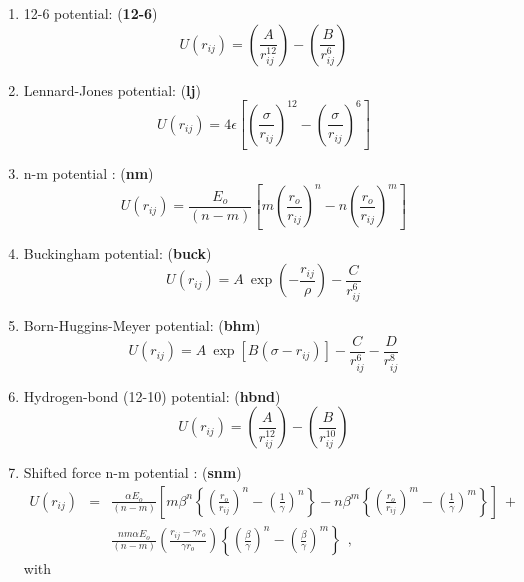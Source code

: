 \begin{enumerate}
\item 12-6 potential:  ({\bf 12-6})
\begin{equation}
U(r_{ij}) =
\left(\frac{A}{r_{ij}^{12}}\right)-\left(\frac{B}{r_{ij}^{6}}\right)
\end{equation}
\item Lennard-Jones potential:  ({\bf lj})
\begin{equation}
U(r_{ij}) = 4\epsilon\left[\left
(\frac{\sigma}{r_{ij}}\right)^{12}-\left(\frac{\sigma}{r_{ij}}\right)^{6}\right]
\end{equation}
\item n-m potential \cite{mie-03a,clarke-86a}:  ({\bf nm})
\begin{equation}
U(r_{ij}) = \frac{E_{o}}{(n-m)}\left[m\left
(\frac{r_{o}}{r_{ij}}\right)^{n}-n\left(\frac{r_{o}}{r_{ij}}\right)^{m}\right]
\end{equation}
\item Buckingham potential:  ({\bf buck})
\begin{equation}
U(r_{ij}) =
A~\exp\left(-\frac{r_{ij}}{\rho}\right)-\frac{C}{r_{ij}^{6}}
\end{equation}
\item Born-Huggins-Meyer potential:  ({\bf bhm})
\begin{equation}
U(r_{ij}) =
A~\exp[B(\sigma-r_{ij})]-\frac{C}{r_{ij}^{6}}-\frac{D}{r_{ij}^{8}}
\end{equation}
\item Hydrogen-bond (12-10) potential:  ({\bf hbnd})
\begin{equation}
U(r_{ij}) =
\left(\frac{A}{r_{ij}^{12}}\right)-\left(\frac{B}{r_{ij}^{10}}\right)
\end{equation}
\item Shifted force n-m potential \cite{mie-03a,clarke-86a}:  ({\bf snm})
\begin{eqnarray}
U(r_{ij})&=&\frac{\alpha E_{o}}{(n-m)}\left [
m\beta^{n}\left \{ \left (\frac{r_{o}}{r_{ij}}\right )^{n}-
\left(\frac{1}{\gamma}\right)^{n}\right \}-
n\beta^{m}\left \{ \left (\frac{r_{o}}{r_{ij}}\right )^{m}-
\left(\frac{1}{\gamma}\right)^{m}\right \} \right ]~+~\phantom{xxxx} \nonumber \\
& & \frac{nm\alpha E_{o}}{(n-m)} \left ( \frac{r_{ij}-\gamma r_{o}}{\gamma r_{o}}
\right )\left\{\left(\frac{\beta}{\gamma}\right
)^{n}-\left(\frac{\beta}{\gamma}\right )^{m}\right \}~~,
\end{eqnarray}
with
\begin{eqnarray}

\end{eqnarray}
\end{enumerate}
